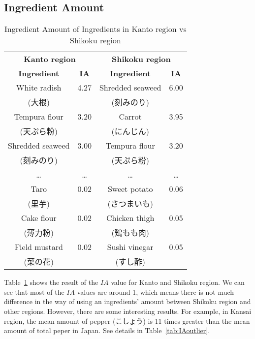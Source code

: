 \subsection{Ingredient Amount}

\begin{CJK}{UTF8}{min}

\begin{table}

\centering
\caption{Ingredient Amount of Ingredients in Kanto region vs Shikoku region}
\begin{tabular}{|c|c|c|c|}
\hline
\multicolumn{2}{|c|}{\textbf{\large Kanto region}} & \multicolumn{2}{|c|}{\textbf{\large Shikoku region}} \\
\cline{1-4}

\textbf{Ingredient} &	\textbf{IA} &\textbf{Ingredient} & \textbf{IA}\\ \hline
White radish & 4.27 &  Shredded seaweed& 6.00 \\
(大根)	& &  (刻みのり)  & \\ \hline
Tempura flour 	& 3.20  & Carrot& 3.95 \\
(天ぷら粉)  & &  (にんじん) & \\ \hline
 Shredded seaweed 		& 3.00 & Tempura flour & 3.20\\
(刻みのり) & &  (天ぷら粉)  & \\ \hline
\ldots &\ldots & \ldots & \ldots \\ \hline
Taro 	& 0.02& Sweet potato &0.06 \\ 
 (里芋)	&  &  (さつまいも) & \\ \hline
Cake flour	& 0.02& Chicken thigh&0.05\\ 
 (薄力粉) & &  (鶏もも肉) & \\ \hline
Field mustard	& 0.02& Sushi vinegar & 0.05\\
 (菜の花)  & & (すし酢) & \\ \hline

\end{tabular}

\label{tab:IA}
\end{table} 
 
Table~\ref{tab:IA} shows the result of the $IA$ value for Kanto and Shikoku region. We can see that most of the $IA$ values are around 1, which means there is not much difference in the way of using an ingredients' amount between Shikoku region and other regions. However, there are some interesting results. For example, in Kansai region, the mean amount of pepper (こしょう) is 11 times greater than the mean amount of total peper in Japan. See details in Table~\ref{tab:IAoutlier}. 





\end{CJK}
